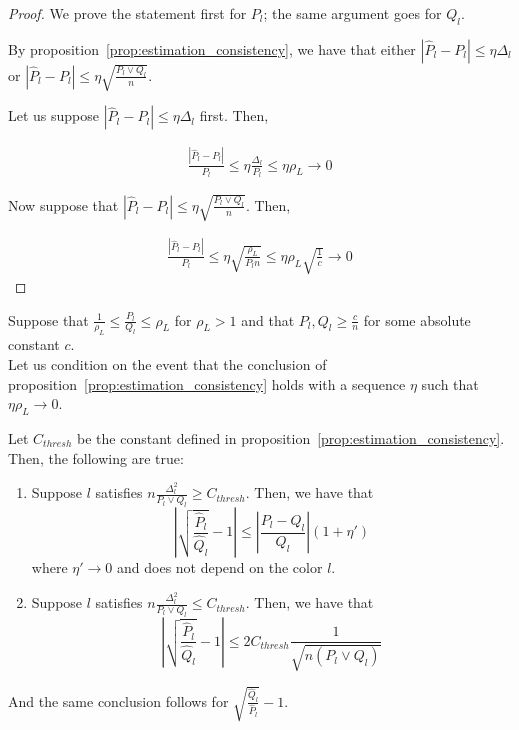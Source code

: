 \begin{proof}

We prove the statement first for $P_l$; the same argument goes for $Q_l$. 

By proposition~\ref{prop:estimation_consistency}, we have that either $| \hat{P}_l - P_l | \leq \eta \Delta_l$ or $| \hat{P}_l - P_l | \leq \eta \sqrt{ \frac{P_l \vee Q_l}{n} }$.

Let us suppose $| \hat{P}_l - P_l | \leq \eta \Delta_l$ first. Then,

\begin{align*}
\frac{ | \hat{P}_l - P_l |}{P_l} \leq \eta \frac{\Delta_l}{P_l} \leq \eta \rho_L \rightarrow 0
\end{align*}

Now suppose that $| \hat{P}_l - P_l | \leq \eta \sqrt{ \frac{P_l \vee Q_l}{n} }$. Then,

\begin{align*}
\frac{| \hat{P}_l - P_l |}{P_l} \leq \eta \sqrt{ \frac{\rho_L}{ P_l n}} \leq \eta \rho_L \sqrt{ \frac{1}{c}} \rightarrow 0
\end{align*}

\end{proof}



\begin{lemma}
\label{lem:sqrt_ratio_pl_ql_minus_1}
Suppose that $\frac{1}{\rho_L} \leq \frac{P_l}{Q_l} \leq \rho_L$ for $\rho_L > 1$ and that $P_l, Q_l \geq \frac{c}{n}$ for some absolute constant $c$.\\ 

Let us condition on the event that the 
conclusion of proposition~\ref{prop:estimation_consistency} holds with a sequence $\eta$ such that $\eta \rho_L \rightarrow 0$. 

Let $C_{thresh}$ be the constant defined in proposition~\ref{prop:estimation_consistency}. Then, the following are true:
\begin{enumerate}
\item 
Suppose $l$ satisfies $n \frac{\Delta_l^2}{P_l \vee Q_l} \geq C_{thresh}$. Then, we have that 
\[
\left| \sqrt{ \frac{\hat{P}_l }{\hat{Q}_l} } - 1 \right|
                    \leq \left| \frac{P_l - Q_l}{Q_l} \right| (1 + \eta') 
\]
where $\eta' \rightarrow 0$ and does not depend on the color $l$. 

\item
Suppose $l$ satisfies $n \frac{\Delta_l^2}{P_l \vee Q_l} \leq C_{thresh}$. Then, we have that
\[
\left| \sqrt{ \frac{\hat{P}_l}{\hat{Q}_l} } - 1 \right| \leq
 2 C_{thresh} \frac{1}{\sqrt{n  (P_l \vee Q_l) } }
\]

\end{enumerate}
And the same conclusion follows for $\sqrt{ \frac{\hat{Q}_l}{\hat{P}_l}} - 1$.

\end{lemma}




